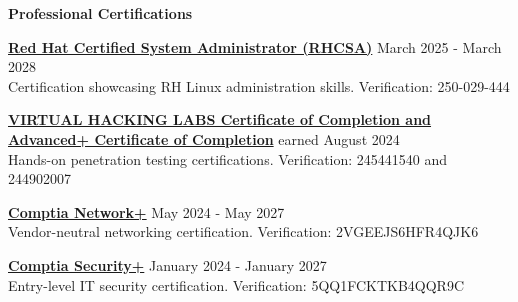 \documentclass[12pt]{article}
\begin{document}

\newpage

\begin{center}
	{\noindent \bfseries Professional Certifications}
\end{center}

\vspace{0.12pt}

\noindent
    {\bfseries \href{https://drive.proton.me/urls/K3QKHE62EM#60PmC5oL7gQH}{Red Hat Certified System Administrator (RHCSA)}} \hfill March 2025 - March 2028 \\[0.04in]
    \noindent Certification showcasing RH Linux administration skills. \hfill Verification: 250-029-444
\noindent

\vspace{0.12in}

\noindent
{\bfseries \href{https://drive.proton.me/urls/WQCXTSR8C0#8HdkpbN5AP9T}{VIRTUAL HACKING LABS Certificate of Completion \newline and Advanced+ Certificate of Completion}} \hfill earned August 2024 \\[0.04in]
\noindent Hands-on penetration testing certifications. \hfill Verification: 245441540 and 244902007
\noindent

\vspace{0.12in}

\noindent
    {\bfseries \href{https://drive.proton.me/urls/0MFCTG9R1W#d9Em1lgeyORn}{Comptia Network+}} \hfill May 2024 - May 2027 \\[0.04in]
    \noindent Vendor-neutral networking certification. \hfill Verification: 2VGEEJS6HFR4QJK6
\noindent

\vspace{0.12in}

\noindent
    {\bfseries \href{https://drive.proton.me/urls/TRGRCY96SR#3wtGCbwKKhTa}{Comptia Security+}} \hfill January 2024 - January 2027 \\[0.04in]
    \noindent Entry-level IT security certification. \hfill Verification: 5QQ1FCKTKB4QQR9C
\noindent
\end{document}

